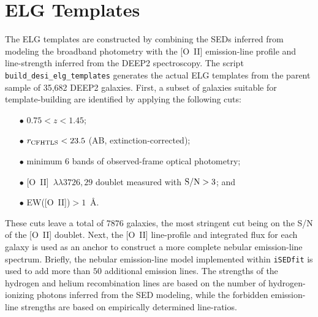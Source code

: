 \documentclass[12pt]{article}
\newcommand{\oii}{[O~II]}
\newcommand{\oiilam}{[O~II]~\ensuremath{\lambda\lambda3726,29}}
\begin{document}
\section{ELG Templates}



The ELG templates are constructed by combining the SEDs inferred from
modeling the broadband photometry with the \oii{} emission-line
profile and line-strength inferred from the DEEP2 spectroscopy.  The
script {\tt build\_desi\_elg\_templates} generates the actual ELG
templates from the parent sample of 35,682 DEEP2 galaxies.  First, a
subset of galaxies suitable for template-building are identified by
applying the following cuts:

\begin{enumerate}
\item[$\bullet$]{$0.75<z<1.45$;}
\item[$\bullet$]{$r_{\rm CFHTLS}<23.5$ (AB, extinction-corrected);}
\item[$\bullet$]{minimum 6 bands of observed-frame optical photometry;}
\item[$\bullet$]{\oiilam{} doublet measured with ${\rm S/N}>3$; and}
\item[$\bullet$]{EW(\oii)$>1$~\AA.}
\end{enumerate}

These cuts leave a total of $7876$ galaxies, the most stringent cut
being on the S/N of the \oii{} doublet.  Next, the \oii{} line-profile
and integrated flux for each galaxy is used as an anchor to construct
a more complete nebular emission-line spectrum.  Briefly, the nebular
emission-line model implemented within {\tt iSEDfit} is used to add
more than $50$ additional emission lines.  The strengths of the
hydrogen and helium recombination lines are based on the number of
hydrogen-ionizing photons inferred from the SED modeling, while the
forbidden emission-line strengths are based on empirically determined
line-ratios.
\end{document}
